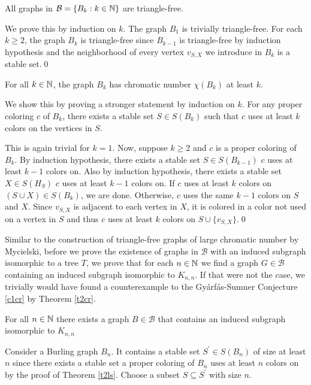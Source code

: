 \begin{thm}
All graphs in $\mathcal{B}=\lbrace B_k :k\in\mathbb{N}\rbrace$ are triangle-free.
\end{thm}

\begin{prf}
We prove this by induction on $k$. The graph $B_1$ is trivially triangle-free. For each $k\geq 2$, the graph $B_k$ is triangle-free since $B_{k-1}$ is triangle-free by induction hypothesis and the neighborhood of every vertex $v_{S,X}$ we introduce in $B_k$ is a stable set.\qed
\end{prf}

\begin{thm}\label{t2ls}
For all $k\in\mathbb{N}$, the graph $B_k$ has chromatic number $\chi (B_k)$ at least $k$.
\end{thm}

\begin{prf}
We show this by proving a stronger statement by induction on $k$. For any proper coloring $c$ of $B_k$, there exists a stable set $S\in S(B_k)$ such that $c$ uses at least $k$ colors on the vertices in $S$.

This is again trivial for $k=1$. Now, suppose $k\geq 2$ and $c$ is a proper coloring of $B_k$. By induction hypothesis, there exists a stable set $S\in S(B_{k-1})$ $c$ uses at least $k-1$ colors on. Also by induction hypothesis, there exists a stable set $X\in S(H_S)$ $c$ uses at least $k-1$ colors on. If $c$ uses at least $k$ colors on $(S\cup X)\in S(B_k)$, we are done. Otherwise, $c$ uses the same $k-1$ colors on $S$ and $X$. Since $v_{S,X}$ is adjacent to each vertex in $X$, it is colored in a color not used on a vertex in $S$ and thus $c$ uses at least $k$ colors on $S\cup\lbrace v_{S,X}\rbrace$.\qed 
\end{prf}

Similar to the construction of triangle-free graphs of large chromatic number by Mycielski, before we prove the existence of graphs in $\mathcal{B}$ with an induced subgraph isomorphic to a tree $T$, we prove that for each $n\in\mathbb{N}$ we find a graph $G\in\mathcal{B}$ containing an induced subgraph isomorphic to $K_{n,n}$. If that were not the case, we trivially would have found a counterexample to the Gyárfás-Sumner Conjecture \ref{c1cr} by Theorem \ref{t2cr}.

\begin{lemma}
For all $n\in\mathbb{N}$ there exists a graph $B\in\mathcal{B}$ that contains an induced subgraph isomorphic to $K_{n,n}$
\end{lemma}
\begin{prf}
Consider a Burling graph $B_n$. It contains a stable set $S^\prime\in S(B_n)$ of size at least $n$ since there exists a stable set a proper coloring of $B_n$ uses at least $n$ colors on by the proof of Theorem \ref{t2ls}. Choose a subset $S\subseteq S^\prime$ with size $n$.
\end{prf}

